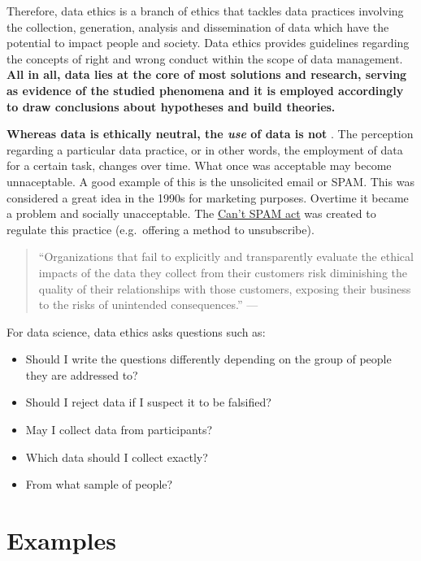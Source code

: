 \documentclass[
]{book}
\providecommand{\tightlist}{%
  \setlength{\itemsep}{0pt}\setlength{\parskip}{0pt}}
\begin{document}
Therefore, data ethics is a branch of ethics that tackles data practices involving the collection, generation, analysis and dissemination of data which have the potential to impact people and society. Data ethics provides guidelines regarding the concepts of right and wrong conduct within the scope of data management. \textbf{All in all, data lies at the core of most solutions and research, serving as evidence of the studied phenomena and it is employed accordingly to draw conclusions about hypotheses and build theories.}

\textbf{Whereas data is ethically neutral, the \emph{use} of data is not} \citep{davis2012ethics}. The perception regarding a particular data practice, or in other words, the employment of data for a certain task, changes over time. What once was acceptable may become unnaceptable. A good example of this is the unsolicited email or SPAM. This was considered a great idea in the 1990s for marketing purposes. Overtime it became a problem and socially unacceptable. The \href{https://en.wikipedia.org/wiki/CAN-SPAM_Act_of_2003}{Can't SPAM act} was created to regulate this practice (e.g.~offering a method to unsubscribe).

\begin{quote}
``Organizations that fail to explicitly and transparently evaluate the ethical impacts of the data they collect from their customers risk diminishing the quality of their relationships with those customers, exposing their business to the risks of unintended consequences.'' --- \citep{davis2012ethics}
\end{quote}

For data science, data ethics asks questions such as:

\begin{itemize}
\tightlist
\item
  Should I write the questions differently depending on the group of people they are addressed to?
\item
  Should I reject data if I suspect it to be falsified?
\item
  May I collect data from participants?
\item
  Which data should I collect exactly?
\item
  From what sample of people?
\end{itemize}

\hypertarget{ethic-examples}{%
\section{Examples}\label{ethic-examples}}
\end{document}
